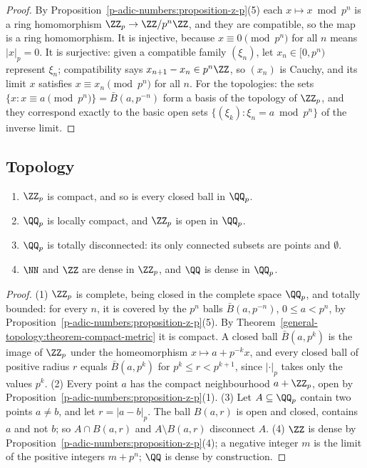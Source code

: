 \begin{proof}
By Proposition~\ref{p-adic-numbers:proposition-z-p}(5) each $x \mapsto x \bmod p^n$ is a ring homomorphism $\ZZ_p \to \ZZ/p^n\ZZ$, and they are compatible, so the map is a ring homomorphism. It is injective,
because $x \equiv 0 \pmod{p^n}$ for all $n$ means $|x|_p = 0$. It is surjective: given a compatible family $(\xi_n)$, let $x_n \in [0, p^n)$ represent $\xi_n$; compatibility says $x_{n+1} - x_n \in p^n\ZZ$,
so $(x_n)$ is Cauchy, and its limit $x$ satisfies $x \equiv x_n \pmod{p^n}$ for all $n$. For the topologies: the sets $\{x : x \equiv a \pmod{p^n}\} = \bar B(a, p^{-n})$ form a basis of the topology of $\ZZ_p$,
and they correspond exactly to the basic open sets $\{(\xi_k) : \xi_n = a \bmod p^n\}$ of the inverse limit.
\end{proof}

\subsection{Topology}\label{p-adic-numbers:subsection-topology}

\begin{theorem}\label{p-adic-numbers:theorem-topology}
\begin{enumerate}
\item $\ZZ_p$ is compact, and so is every closed ball in $\QQ_p$.
\item $\QQ_p$ is locally compact, and $\ZZ_p$ is open in $\QQ_p$.
\item $\QQ_p$ is totally disconnected: its only connected subsets are points and $\emptyset$.
\item $\NN$ and $\ZZ$ are dense in $\ZZ_p$, and $\QQ$ is dense in $\QQ_p$.
\end{enumerate}
\end{theorem}

\begin{proof}
(1) $\ZZ_p$ is complete, being closed in the complete space $\QQ_p$, and totally bounded: for every $n$, it is covered by the $p^n$ balls $\bar B(a, p^{-n})$, $0 \leq a < p^n$, by
Proposition~\ref{p-adic-numbers:proposition-z-p}(5). By Theorem~\ref{general-topology:theorem-compact-metric} it is compact. A closed ball $\bar B(a, p^k)$ is the image of $\ZZ_p$ under the
homeomorphism $x \mapsto a + p^{-k}x$, and every closed ball of positive radius $r$ equals $\bar B(a, p^k)$ for $p^k \leq r < p^{k+1}$, since $|\cdot|_p$ takes only the values $p^k$.
(2) Every point $a$ has the compact neighbourhood $a + \ZZ_p$, open by Proposition~\ref{p-adic-numbers:proposition-z-p}(1).
(3) Let $A \subseteq \QQ_p$ contain two points $a \neq b$, and let $r = |a - b|_p$. The ball $B(a, r)$ is open and closed, contains $a$ and not $b$; so $A \cap B(a, r)$ and $A \setminus B(a, r)$
disconnect $A$.
(4) $\ZZ$ is dense by Proposition~\ref{p-adic-numbers:proposition-z-p}(4); a negative integer $m$ is the limit of the positive integers $m + p^n$; $\QQ$ is dense by construction.
\end{proof}

